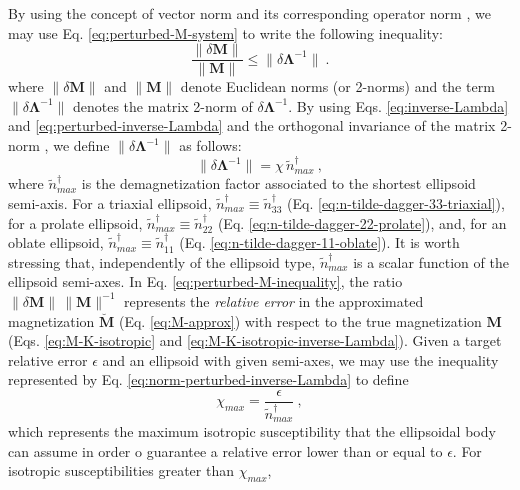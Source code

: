 \documentclass[gmd, manuscript]{copernicus}
\begin{document}
By using the concept of vector norm and its corresponding
operator norm \citep{demmel1997, golub2013}, we may use Eq.
\ref{eq:perturbed-M-system} to write the following inequality:
\begin{equation}
\frac{\| \delta \mathbf{M} \|}{\| \mathbf{M} \|} \leq
\| \delta \mathbf{\Lambda}^{-1} \| \: .
\label{eq:perturbed-M-inequality}
\end{equation}
where $\| \delta \mathbf{M} \|$ and $\| \mathbf{M} \|$
denote Euclidean norms (or 2-norms) and the term
$\| \delta \mathbf{\Lambda}^{-1} \|$ denotes the matrix 2-norm
of $\delta \mathbf{\Lambda}^{-1}$.
By using Eqs. \ref{eq:inverse-Lambda} and \ref{eq:perturbed-inverse-Lambda}
and the orthogonal invariance of the matrix 2-norm
\citep{demmel1997, golub2013}, we define
$\| \delta \mathbf{\Lambda}^{-1} \|$ as follows:
\begin{equation}
\| \delta \mathbf{\Lambda}^{-1} \| = \chi \,
\tilde{n}^{\dagger}_{max} \: ,
\label{eq:norm-perturbed-inverse-Lambda}
\end{equation}
where $\tilde{n}^{\dagger}_{max}$ is the demagnetization
factor associated to the shortest ellipsoid semi-axis.
For a triaxial ellipsoid,
$\tilde{n}^{\dagger}_{max} \equiv \tilde{n}^{\dagger}_{33}$
(Eq. \ref{eq:n-tilde-dagger-33-triaxial}), for a prolate ellipsoid,
$\tilde{n}^{\dagger}_{max} \equiv \tilde{n}^{\dagger}_{22}$
(Eq. \ref{eq:n-tilde-dagger-22-prolate}), and,
for an oblate ellipsoid,
$\tilde{n}^{\dagger}_{max} \equiv \tilde{n}^{\dagger}_{11}$
(Eq. \ref{eq:n-tilde-dagger-11-oblate}).
It is worth stressing that, independently of the ellipsoid
type, $\tilde{n}^{\dagger}_{max}$ is
a scalar function of the ellipsoid semi-axes.
In Eq. \ref{eq:perturbed-M-inequality}, the ratio
$\| \delta \mathbf{M} \| \, \| \mathbf{M} \|^{-1}$ represents the
\textit{relative error} in the approximated magnetization
$\breve{\mathbf{M}}$ (Eq. \ref{eq:M-approx}) with respect
to the true magnetization $\mathbf{M}$ (Eqs. \ref{eq:M-K-isotropic}
and \ref{eq:M-K-isotropic-inverse-Lambda}).
Given a target relative error $\epsilon$ and an ellipsoid
with given semi-axes, we may use the inequality
represented by Eq. \ref{eq:norm-perturbed-inverse-Lambda}
to define
\begin{equation}
\chi_{max} = \frac{\epsilon}{\tilde{n}^{\dagger}_{max}} \: ,
\label{eq:chi-max}
\end{equation}
which represents the maximum isotropic susceptibility
that the ellipsoidal body can assume in order o guarantee
a relative error lower than or equal to $\epsilon$.
For isotropic susceptibilities greater than $\chi_{max}$,
\end{document}
